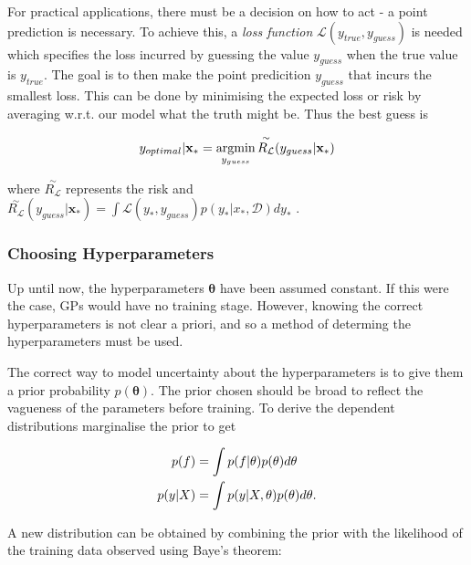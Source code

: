 \documentclass[12pt,a4paper]{report}
\theoremstyle{definition}
\begin{document}
For practical applications, there must be a decision on how to act - a point prediction is necessary. 
To achieve this, a \emph{loss function} $\mathcal{L}(y_{true}, y_{guess})$  is needed which specifies the loss incurred by guessing the value $y_{guess}$ when the true value is $y_{true}$. 
The goal is to then make the point predicition $y_{guess}$ that incurs the smallest loss.
This can be done by minimising the expected loss or risk by averaging w.r.t. our model what the truth might be.
Thus the best guess is 

\begin{equation}
	\centering
	y_{optimal} | \textbf{x}_{*} = \underset{y_{guess}}{\textrm{argmin}} \, \overset{\sim}{R_{\mathcal{L}}}(y_{guess} | \textbf{x}_{*})
\end{equation}

where $\overset{\sim}{R_{\mathcal{L}}}$ represents the risk and $\overset{\sim}{R_{\mathcal{L}}}(y_{guess} | \textbf{x}_{*}) = \int \mathcal{L}(y_{*}, y_{guess}) p(y_{*} | x_{*}, \mathcal{D}) dy_{*}$ \citep{RasmussenWilliams2006}.

\subsubsection{Choosing Hyperparameters}

Up until now, the hyperparameters $\boldsymbol{\theta}$ have been assumed constant.
If this were the case, GPs would have no training stage. 
However, knowing the correct hyperparameters is not clear a priori, and so a method of determing the hyperparameters must be used.

The correct way to model uncertainty about the hyperparameters is to give them a prior probability $p(\boldsymbol{\theta})$.
The prior chosen should be broad to reflect the vagueness of the parameters before training.
To derive the dependent distributions marginalise the prior to get

\begin{equation}
	\begin{aligned}
		\centering
		p(f) &= \int p(f | \theta) p(\theta) d\theta \\
		p(y | X) &= \int p(y | X, \theta) p(\theta) d\theta.
	\end{aligned}
\end{equation}

A new distribution can be obtained by combining the prior with the likelihood of the training data observed using Baye's theorem:
\end{document}

